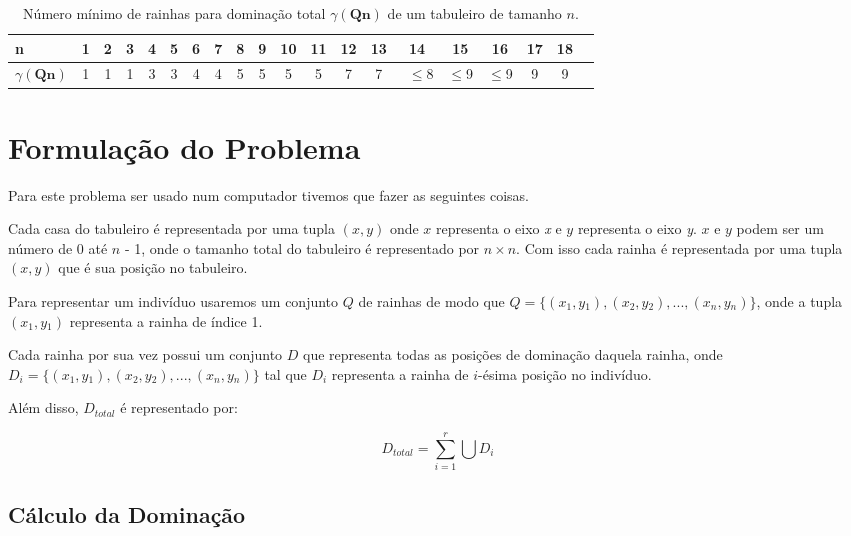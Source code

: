 \documentclass[
	article,			%
	11pt,				%
	oneside,			%
	a4paper,			%
	english,			%
	brazil,				%
	sumario=tradicional
	]{abntex2}
\begin{document}
\begin{table}[ht]
  \caption{Número mínimo de rainhas para dominação total $\gamma(\textbf{Qn})$ de um tabuleiro de tamanho $\textit{n}$.}
  \begin{tabular}{l*{18}{c}r}
    n              & 1 & 2 & 3 & 4 & 5  & 6 & 7 & 8 & 9 & 10 & 11 & 12 & 13 & 14 & 15 & 16 & 17 & 18 \\
    \hline
    $\gamma(\textbf{Qn})$ & 1 & 1 & 1 & 3 & 3 & 4 & 4 & 5 & 5 & 5 & 5 & 7 & 7 & ~$\leq$8 & $\leq$9 & $\leq$9  & 9 & 9 \\
  \end{tabular}
  \label{tabela1}
\end{table}


\section{Formulação do Problema}

Para este problema ser usado num computador tivemos que fazer as seguintes coisas. 

Cada casa do tabuleiro é representada por uma tupla $(x,y)$ onde $x$ representa o eixo \textit{x} e $y$ representa o eixo \textit{y}. $x$ e $y$ podem ser um número de 0 até $n$ - 1, onde o tamanho total do tabuleiro é representado por $n \times n$. Com isso cada rainha é representada por uma tupla $(x,y)$ que é sua posição no tabuleiro.

Para representar um indivíduo usaremos  um conjunto $Q$ de rainhas de modo que $Q=\{(x{_{1}},y{_{1}}), (x{_{2}},y{_{2}}), ..., (x{_{n}},y{_{n}})\}$, onde a tupla \textbf{$(x{_{1}},y{_{1}})$} representa a rainha de índice 1. 

Cada rainha por sua vez possui um conjunto $D$ que representa todas as posições de dominação daquela rainha, onde $D{_{i}}=\{(x{_{1}},y{_{1}}), (x{_{2}},y{_{2}}), ..., (x{_{n}},y{_{n}})\}$ tal que $D{_{i}}$ representa a rainha de $i$-ésima posição no indivíduo.

Além disso, $D{_{total}}$ é representado por:

\begin{equation}
 D{_{total}}=\sum_{i=1}^{r}\bigcup D{_{i}}
\end{equation}

\subsection{Cálculo da Dominação}
\end{document}
